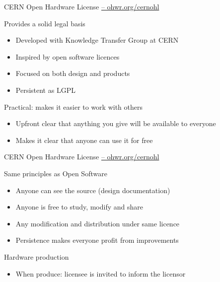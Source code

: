 \documentclass[compress,red]{beamer}
\begin{document}
\begin{frame}{CERN Open Hardware License \href{http://ohwr.org/cernohl}{-- ohwr.org/cernohl}}
	\begin{block}{Provides a solid legal basis}
   \begin{itemize}
	\item Developed with Knowledge Transfer Group at CERN 
	\item Inspired by open software licences
	\item Focused on both design and products
	\item Persistent as LGPL
   \end{itemize}
	\end{block}

\begin{block}{Practical: makes it easier to work with others}
   \begin{itemize}
	\item Upfront clear that anything you give will be available to everyone
	\item Makes it clear that anyone can use it for free
   \end{itemize}
\end{block}
\end{frame}

\begin{frame}{CERN Open Hardware License \href{http://ohwr.org/cernohl}{-- ohwr.org/cernohl}}
	\begin{block}{Same principles as Open Software}
 \begin{itemize}
	 \item Anyone can see the source (design documentation)
	\item Anyone is free to study, modify and share
	\item Any modification and distribution under same licence
	\item Persistence makes everyone profit from improvements
\end{itemize}
	\end{block}

	\begin{block}{Hardware production}
 \begin{itemize}
	\item When produce: licensee is invited to inform the licensor
\end{itemize}
	\end{block}

%
\end{frame}
\end{document}
